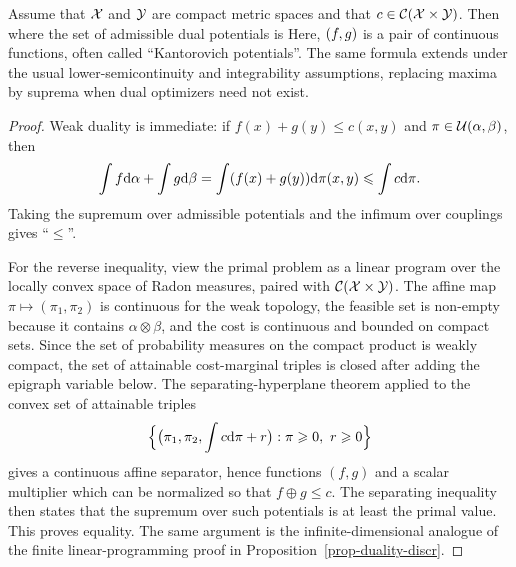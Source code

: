 \begin{prop}\label{prop-kantorovich-duality-general}
	Assume that $\mathcal{X}$ and $\mathcal{Y}$ are compact metric spaces and that $c\in\mathcal{C}(\mathcal{X}\times\mathcal{Y})$. Then
	where the set of admissible dual potentials is
	Here, $(f,g)$ is a pair of continuous functions, often called ``Kantorovich potentials''.
	The same formula extends under the usual lower-semicontinuity and integrability assumptions, replacing maxima by suprema when dual optimizers need not exist.
\end{prop}
\begin{proof}
	Weak duality is immediate: if $f(x)+g(y)\leq c(x,y)$ and $\pi\in\mathcal{U}(\alpha,\beta)$, then
	\[
		\int f\mathrm{d}\alpha+\int g\mathrm{d}\beta
		=
		\int (f(x)+g(y))\mathrm{d}\pi(x,y)
		\leqslant
		\int c\mathrm{d}\pi.
	\]
	Taking the supremum over admissible potentials and the infimum over couplings gives ``$\leq$''.

	For the reverse inequality, view the primal problem as a linear program over the locally convex space of Radon measures, paired with $\mathcal{C}(\mathcal{X}\times\mathcal{Y})$. The affine map $\pi\mapsto(\pi_1,\pi_2)$ is continuous for the weak topology, the feasible set is non-empty because it contains $\alpha\otimes\beta$, and the cost is continuous and bounded on compact sets. Since the set of probability measures on the compact product is weakly compact, the set of attainable cost-marginal triples is closed after adding the epigraph variable below. The separating-hyperplane theorem applied to the convex set of attainable triples
	\[
		\Big\{\big(\pi_1,\pi_2,\int c\mathrm{d}\pi+r\big): \pi\geqslant0,\ r\geqslant0\Big\}
	\]
	gives a continuous affine separator, hence functions $(f,g)$ and a scalar multiplier which can be normalized so that $f\oplus g\leq c$. The separating inequality then states that the supremum over such potentials is at least the primal value. This proves equality. The same argument is the infinite-dimensional analogue of the finite linear-programming proof in Proposition~\ref{prop-duality-discr}.
	\end{proof}

